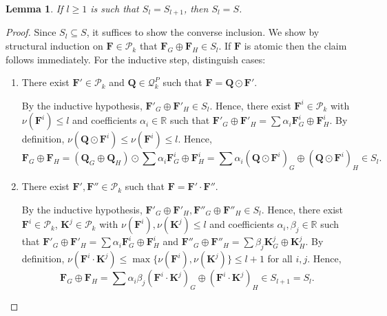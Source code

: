 \documentclass[11pt,a4paper]{article}
\theoremstyle{plain}
\newtheorem{lem}[thm]{Lemma}
\theoremstyle{remark}
\theoremstyle{definition}
\begin{document}
\begin{lem} \label{lem:chain-collapse}
	If $l \geq 1$ is such that $S_l = S_{l+1}$,
	then $S_l = S$.
\end{lem}
\begin{proof}
	Since $S_l \subseteq S$, it suffices to show the converse inclusion.
	We show by structural induction on $\boldsymbol{F} \in \mathcal{P}_k$ that $\boldsymbol{F}_G \oplus \boldsymbol{F}_H \in S_l$.
	If $\boldsymbol{F}$ is atomic then the claim follows immediately.
	For the inductive step, distinguish cases:
	\begin{enumerate}
		\item There exist $\boldsymbol{F}' \in \mathcal{P}_k$ and $\boldsymbol{Q} \in \mathcal{Q}_k^P$ such that $\boldsymbol{F} = \boldsymbol{Q} \odot \boldsymbol{F}'$.
		
		By the inductive hypothesis, $\boldsymbol{F}'_G \oplus \boldsymbol{F}'_H \in S_l$.
		Hence, there exist $\boldsymbol{F}^i \in \mathcal{P}_k$ with $\nu(\boldsymbol{F}^i) \leq l$ and coefficients $\alpha_i \in \mathbb{R}$ such that $\boldsymbol{F}'_G \oplus \boldsymbol{F}'_H  = \sum \alpha_i \boldsymbol{F}^i_G \oplus \boldsymbol{F}^i_H$.
		By definition, $\nu(\boldsymbol{Q} \odot \boldsymbol{F}^i) \leq \nu(\boldsymbol{F}^i) \leq l$.
		Hence,
		\[
			\boldsymbol{F}_G \oplus \boldsymbol{F}_H = (\boldsymbol{Q}_G \oplus \boldsymbol{Q}_H) \odot \sum \alpha_i \boldsymbol{F}^i_G \oplus \boldsymbol{F}^i_H
			= \sum \alpha_i (\boldsymbol{Q} \odot \boldsymbol{F}^i)_G
			 \oplus (\boldsymbol{Q} \odot \boldsymbol{F}^i)_H
			 \in S_l.
		\]
		
		\item There exist $\boldsymbol{F}', \boldsymbol{F}'' \in \mathcal{P}_k$ such that $\boldsymbol{F} = \boldsymbol{F}' \cdot \boldsymbol{F}''$.
		
		By the inductive hypothesis, $\boldsymbol{F}'_G \oplus \boldsymbol{F}'_H,\boldsymbol{F}''_G \oplus \boldsymbol{F}''_H  \in S_l$.
		Hence, there exist $\boldsymbol{F}^i \in \mathcal{P}_k$, $\boldsymbol{K}^j \in \mathcal{P}_k$ with $\nu(\boldsymbol{F}^i),\nu(\boldsymbol{K}^j) \leq l$ and coefficients $\alpha_i, \beta_j \in \mathbb{R}$ such that $\boldsymbol{F}'_G \oplus \boldsymbol{F}'_H  = \sum \alpha_i \boldsymbol{F}^i_G \oplus \boldsymbol{F}^i_H$
		and $\boldsymbol{F}''_G \oplus \boldsymbol{F}''_H  = \sum \beta_j \boldsymbol{K}^j_G \oplus \boldsymbol{K}^j_H$.
		By definition, $\nu(\boldsymbol{F}^i \cdot \boldsymbol{K}^j) \leq \max\{ \nu(\boldsymbol{F}^i), \nu(\boldsymbol{K}^j)\} \leq l+1$ for all $i, j$.
		Hence, 
		\[
			\boldsymbol{F}_G \oplus \boldsymbol{F}_H = \sum \alpha_i \beta_j (\boldsymbol{F}^i \cdot \boldsymbol{K}^j)_G \oplus 
			(\boldsymbol{F}^i \cdot \boldsymbol{K}^j)_H
			\in S_{l+1}  = S_l.
		\]
		

\end{enumerate}
\end{proof}
\end{document}
